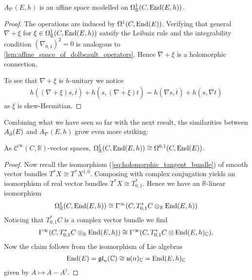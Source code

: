 \documentclass[12pt]{ociamthesis}  %
\begin{document}
\begin{lemma}
  $A_\nabla(E,h)$ is an affine space modelled on
  $\Omega^1_{\mathbb{R}}(C,\operatorname{End}(E,h))$.
  \begin{proof}
    The operations are induced by $\Omega^1(C,\operatorname{End}(E))$.
    Verifying that general $\nabla + \xi$ for
    $\xi\in\Omega^1_{\mathbb{R}}(C,\operatorname{End}(E,h))$
    satsify the Leibniz rule and the integrability
    condition $(\nabla_{0,1})^2=0$ is analogous to
    \ref{lem:affine_space_of_dolbeault_operators}. Hence $\nabla + \xi$
    is a holomorphic connection.

    To see that $\nabla + \xi$ is $h$-unitary we notice
    \begin{align*}
      h((\nabla + \xi)s, \bar t) + h(s,\overline{(\nabla + \xi)t})
      =  h(\nabla s, \bar t) + h(s,\overline{\nabla t})
    \end{align*}
    as $\xi$ is skew-Hermitian.
  \end{proof}
\end{lemma}

Combining what we have seen so far with the next result, the
similarities between $A_{\bar{\partial}} (E)$ and $A_\nabla(E,h)$ grow even more
striking:

\begin{lemma}\label{lem:real_vector_space_iso}
  As $\mathscr C^\infty(C,\mathbb R)$-vector spaces,
  $\Omega^1_{\mathbb{R}}(C,\operatorname{End}(E,h))\cong\Omega^{0,1}(C,\operatorname{End}(E))$.
  \begin{proof}
    Now recall the isomorphism (\ref{eq:holomorphic_tangent_bundle}) of
    smooth vector bundles $T^* X \cong T^*X^{1,0}$. Composing with
    complex conjugation yields an isomorphism of real vector bundles
    $T^*X \cong T^*_{0,1}$. Hence we have an $\mathbb{R}$-linear
    isomorphism
    \begin{align*}
      \Omega^1_{\mathbb{R}}(C,\operatorname{End}(E,h))
      \cong \Gamma^\infty(C,T^*_{0,1}C \otimes_{\mathbb{R}}\operatorname{End}(E,h))
    \end{align*}
    Noticing that $T_{0,1}^* C$ is a complex vector bundle
    we find
    \begin{align*}
      \Gamma^\infty(C,T^*_{0,1}C \otimes_{\mathbb{R}}\operatorname{End}(E,h))
      \cong\Gamma^\infty(C,T^*_{0,1}C \otimes\operatorname{End}(E,h)_{\mathbb{C}}).
    \end{align*}
    Now the claim follows from the isomorphism of Lie algebras
    \begin{align*}
      \operatorname{End}(E)
      =\mathfrak{gl}_n(\mathbb{C})
      \cong\mathfrak u(n)_{\mathbb{C}}
      =\operatorname{End}(E,h)_{\mathbb C}
    \end{align*}
    given by $A \mapsto A-A^\dagger$.
  \end{proof}
\end{lemma}
\end{document}
